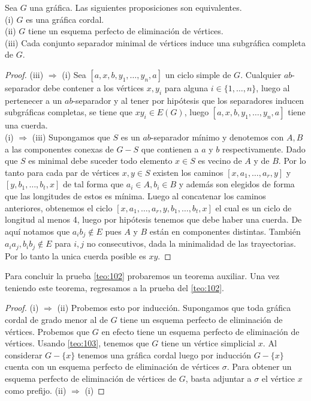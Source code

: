 \begin{teorema}
\label{teo:102}
    Sea $G$ una gráfica. Las siguientes proposiciones son equivalentes.\\
    (i) $G$ es una gráfica cordal.\\
    (ii) $G$ tiene un esquema perfecto de eliminación de vértices.\\
    (iii) Cada conjunto separador minimal de vértices induce una subgráfica
    completa de $G$.
\end{teorema}

\begin{proof}
    (iii) $\Rightarrow$ (i) Sea $[a,x,b, y_1, \dots, y_n, a]$ un ciclo simple de
    $G$. Cualquier $ab$-separador debe contener a los vértices $x,y_i$ para
    alguna $i\in \{1, \dots, n \}$, luego al pertenecer a un $ab$-separador y al
    tener por hipótesis que los separadores inducen subgráficas completas, se
    tiene que $xy_i \in E(G)$, luego $[a,x,b, y_1, \dots, y_n, a]$ tiene una
    cuerda.\\
    
    (i) $\Rightarrow$ (iii) Supongamos que $S$ es un $ab$-separador mínimo y
    denotemos con $A,B$ a las componentes conexas de $G-S$ que contienen a $a$ y
    $b$ respectivamente. Dado que $S$ es minimal debe suceder todo elemento
    $x\in S$ es vecino de $A$ y de $B$. Por lo tanto para cada par de vértices
    $x,y\in S$ existen los caminos $[x,a_1, \dots, a_r,y]$ y $[y,b_1,\dots,
    b_t,x]$ de tal forma que $a_i\in A, b_i\in B$ y además son elegidos de forma
    que las longitudes de estos es mínima. Luego al concatenar los caminos
    anteriores, obtenemos el ciclo $[x,a_1, \dots, a_r,y,b_1,\dots, b_t,x]$ el
    cual es un ciclo de longitud al menos 4, luego por hipótesis tenemos que
    debe haber una cuerda. De aquí notamos que $a_ib_j\notin E$ pues $A$ y $B$
    están en componentes distintas. También $a_ia_j, b_ib_j \notin E$ para $i,j$
    no consecutivos, dada la minimalidad de las trayectorias. Por lo tanto la
    unica cuerda posible es $xy$.
    
\end{proof}

Para concluir la prueba \cref{teo:102} probaremos un teorema auxiliar. Una vez
teniendo este teorema, regresamos a la prueba del \cref{teo:102}. 
\begin{proof}
    (i) $\Rightarrow$ (ii) Probemos esto por inducción. Supongamos que toda
    gráfica cordal de grado menor al de $G$ tiene un esquema perfecto de
    eliminación de vértices. Probemos que $G$ en efecto tiene un esquema
    perfecto de eliminación de vértices. Usando \cref{teo:103}, tenemos que $G$
    tiene un vértice simplicial $x$. Al considerar $G-\{x\}$ tenemos una gráfica
    cordal luego por inducción $G-\{x\}$ cuenta con un esquema perfecto de
    eliminación de vértices $\sigma $. Para obtener un esquema perfecto de
    eliminación de vértices de $G$, basta adjuntar a $\sigma$ el vértice $x$
    como prefijo. (ii) $\Rightarrow$ (i) 
    
\end{proof}

